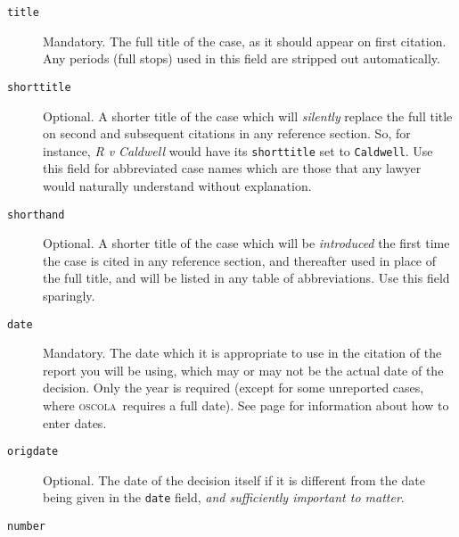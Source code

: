\documentclass[a4paper,
               11pt,
	       DIV=1,			   
	       footinclude=false]
	      {scrartcl}
\newcommand{\oscolashort}{\textsc{oscola}\nocite{oscola}}
\begin{document}
\begin{description}
\item[\texttt{title}]
Mandatory. The full title of the case, as it
  should appear on first citation. Any periods (full stops) used in this field are stripped out automatically.
\item[\texttt{shorttitle}]
Optional. A shorter title of the case which
  will \emph{silently} replace the full title on second and subsequent
  citations in any reference section. So, for instance, \emph{R v
    Caldwell} would have its \texttt{shorttitle} set to
  \texttt{Caldwell}. Use this field for abbreviated case names which
  are those that any lawyer would naturally understand without
  explanation.
\item[\texttt{shorthand}]
Optional. A shorter title of the case which
  will be \emph{introduced} the first time the case is cited in any
  reference section, and thereafter used in place of the full title,
  and will be listed in any table of abbreviations. Use this field
  sparingly.
\item[\texttt{date}]
Mandatory. The date which it is appropriate to
  use in the citation of the report you will be using, which may or
  may not be the actual date of the decision. Only the year is
  required (except for some unreported cases, where \oscolashort\
  requires a full date). See page \pageref{dateformat}
  for information about how to enter dates.
\item[\texttt{origdate}]
Optional. The date of the decision itself if
  it is different from the date being given in the \texttt{date}
  field, \emph{and sufficiently important to matter}.
\item[\texttt{number}]

\end{description}
\end{document}
